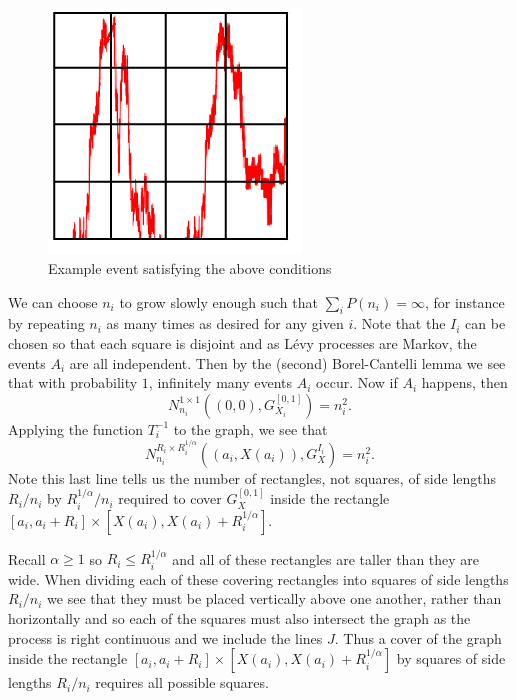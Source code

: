 \begin{figure}[h]\label{fig:example-rectangle1}
    \centering
    \includegraphics[width=0.6\textwidth]{pics/ch-brownian/event-rectangles.png}
    \caption{Example event satisfying the above conditions}
    \label{fig:example-rectangle1}
\end{figure}

We can choose $n_i$ to grow slowly enough such that $\sum_{i}P(n_i)=\infty$, for instance by repeating $n_i$ as many times as desired for any given $i$. Note that the $I_i$ can be chosen so that each square is disjoint and as L\'evy processes are Markov, the events $A_i$ are all independent. Then by the (second) Borel-Cantelli lemma we see that with probability $1$, infinitely many events $A_i$ occur. Now if $A_i$ happens, then
\[
N_{n_i}^{1 \times 1 }\left((0,0),G_{X_i}^{[0,1]}\right)=n_i^2.
\]
Applying the function $T^{-1}_i$ to the graph, we see that
\[
N_{n_i}^{R_i \times R_i^{1/\alpha} }\left((a_i,X(a_i)),G_{X}^{I_i}\right)=n_i^2.
\]
Note this last line tells us the number of rectangles, not squares, of side lengths $R_i / n_i$ by $R_i^{1/\alpha} / n_i$ required to cover $G_X^{[0,1]}$ inside the rectangle $[a_i, a_i + R_i] \times [X(a_i), X(a_i) + R_i^{1/\alpha}]$. 

Recall $\alpha \ge 1$ so $R_i\leq R_i^{1/\alpha}$ and all of these rectangles are taller than they are wide. When dividing each of these covering rectangles into squares of side lengths $R_i / n_i$ we see that they must be placed vertically above one another, rather than horizontally and so each of the squares must also intersect the graph as the process is right continuous and we include the lines $J$. Thus a cover of the graph inside the rectangle $[a_i, a_i + R_i] \times [X(a_i), X(a_i) + R_i^{1/\alpha}]$ by squares of side lengths $R_i / n_i$ requires all possible squares.


